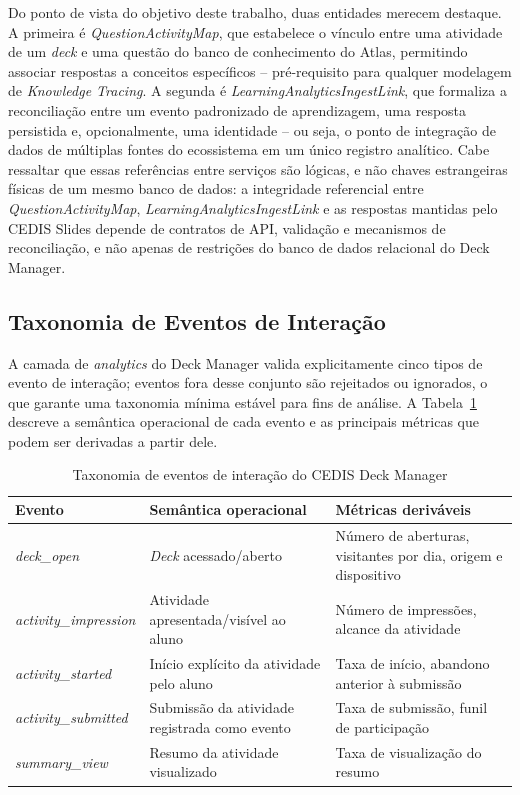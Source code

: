 Do ponto de vista do objetivo deste trabalho, duas entidades merecem
destaque. A primeira é \textit{QuestionActivityMap}, que estabelece o
vínculo entre uma atividade de um \textit{deck} e uma questão do banco de
conhecimento do Atlas, permitindo associar respostas a conceitos
específicos -- pré-requisito para qualquer modelagem de \textit{Knowledge
Tracing}. A segunda é \textit{LearningAnalyticsIngestLink}, que formaliza
a reconciliação entre um evento padronizado de aprendizagem, uma resposta
persistida e, opcionalmente, uma identidade -- ou seja, o ponto de
integração de dados de múltiplas fontes do ecossistema em um único
registro analítico. Cabe ressaltar que essas referências entre serviços
são lógicas, e não chaves estrangeiras físicas de um mesmo banco de
dados: a integridade referencial entre \textit{QuestionActivityMap},
\textit{LearningAnalyticsIngestLink} e as respostas mantidas pelo CEDIS
Slides depende de contratos de API, validação e mecanismos de
reconciliação, e não apenas de restrições do banco de dados relacional do
Deck Manager.

\subsection{Taxonomia de Eventos de Interação}
\label{subsec:taxonomia-eventos}

A camada de \textit{analytics} do Deck Manager valida explicitamente cinco
tipos de evento de interação; eventos fora desse conjunto são rejeitados
ou ignorados, o que garante uma taxonomia mínima estável para fins de
análise. A Tabela~\ref{tab:eventos-deck-manager} descreve a semântica
operacional de cada evento e as principais métricas que podem ser
derivadas a partir dele.

\begin{table}[htb]
\caption{Taxonomia de eventos de interação do CEDIS Deck Manager}
\label{tab:eventos-deck-manager}
\centering
\begin{tabularx}{\textwidth}{l>{\raggedright\arraybackslash}X>{\raggedright\arraybackslash}X}
\hline
\textbf{Evento} & \textbf{Semântica operacional} & \textbf{Métricas deriváveis} \\
\hline
\textit{deck\_open} & \textit{Deck} acessado/aberto & Número de aberturas, visitantes por dia, origem e dispositivo \\
\hline
\textit{activity\_impression} & Atividade apresentada/visível ao aluno & Número de impressões, alcance da atividade \\
\hline
\textit{activity\_started} & Início explícito da atividade pelo aluno & Taxa de início, abandono anterior à submissão \\
\hline
\textit{activity\_submitted} & Submissão da atividade registrada como evento & Taxa de submissão, funil de participação \\
\hline
\textit{summary\_view} & Resumo da atividade visualizado & Taxa de visualização do resumo \\
\hline
\end{tabularx}
\end{table}


